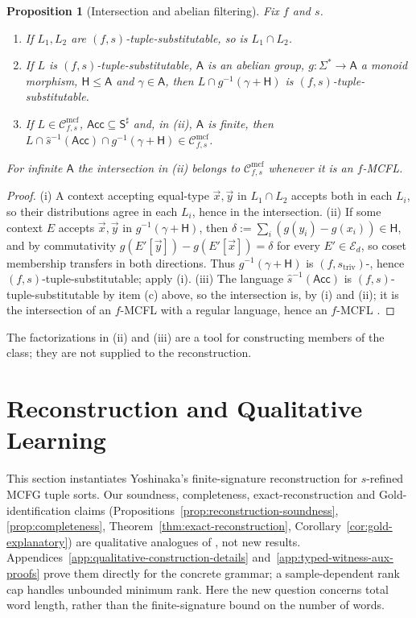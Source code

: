 \documentclass[11pt]{article}
\numberwithin{equation}{section}
\theoremstyle{plain}
\newtheorem{proposition}[theorem]{Proposition}
\theoremstyle{definition}
\theoremstyle{remark}
\newcommand{\Cmcf}[2]{\mathcal{C}^{\mathrm{mcf}}_{#1,#2}}
\newcommand{\tuple}[1]{\vec{#1}}
\theoremstyle{plain}
\begin{document}
\begin{proposition}[Intersection and abelian filtering]
\label{prop:abelian-coset-filter}
Fix $f$ and $s$.
\begin{enumerate}[label=(\roman*),leftmargin=*]
\item If $L_1,L_2$ are $(f,s)$-tuple-substitutable, so is $L_1\cap L_2$.
\item If $L$ is $(f,s)$-tuple-substitutable, $\mathsf A$ is an abelian group,
$g:\Sigma^*\to\mathsf A$ a monoid morphism, $\mathsf H\le\mathsf A$ and
$\gamma\in\mathsf A$, then $L\cap g^{-1}(\gamma+\mathsf H)$ is
$(f,s)$-tuple-substitutable.
\item If $L\in\Cmcf{f}{s}$, $\mathsf{Acc}\subseteq\mathsf S^\sharp$ and, in (ii),
$\mathsf A$ is finite, then
$L\cap\widehat{s}^{-1}(\mathsf{Acc})\cap g^{-1}(\gamma+\mathsf H)\in\Cmcf{f}{s}$.
\end{enumerate}
For infinite $\mathsf A$ the intersection in (ii) belongs to $\Cmcf{f}{s}$ whenever
it is an $f$-MCFL.
\end{proposition}

\begin{proof}
(i) A context accepting equal-type $\tuple x,\tuple y$ in $L_1\cap L_2$ accepts
both in each $L_i$, so their distributions agree in each $L_i$, hence in the
intersection.  (ii) If some context $E$ accepts $\tuple x,\tuple y$ in
$g^{-1}(\gamma+\mathsf H)$, then
$\delta:=\sum_i(g(y_i)-g(x_i))\in\mathsf H$, and by commutativity
$g(E'[\tuple y])-g(E'[\tuple x])=\delta$ for every
$E'\in\mathcal E_d$, so coset membership transfers in both directions.  Thus
$g^{-1}(\gamma+\mathsf H)$ is $(f,s_{\mathrm{triv}})$-, hence
$(f,s)$-tuple-substitutable; apply (i).  (iii) The language
$\widehat{s}^{-1}(\mathsf{Acc})$ is $(f,s)$-tuple-substitutable by item (c) above,
so the intersection is, by (i) and (ii); it is the intersection of an $f$-MCFL with
a regular language, hence an $f$-MCFL \cite{SekiEtAl1991}.
\end{proof}

The factorizations in (ii) and (iii) are a tool for constructing members of the
class; they are not supplied to the reconstruction.

\section{Reconstruction and Qualitative Learning}
\label{sec:learner}

This section instantiates Yoshinaka's finite-signature reconstruction
\cite{Yoshinaka2015General} for $s$-refined MCFG tuple sorts.
Our soundness, completeness, exact-reconstruction and Gold-identification
claims (Propositions~\ref{prop:reconstruction-soundness},
\ref{prop:completeness}, Theorem~\ref{thm:exact-reconstruction},
Corollary~\ref{cor:gold-explanatory}) are qualitative analogues of
\cite[Lemmas~2--3 and Theorem~1]{Yoshinaka2015General},
not new results.  Appendices~\ref{app:qualitative-construction-details}
and~\ref{app:typed-witness-aux-proofs} prove them directly for the
concrete grammar; a sample-dependent rank cap handles unbounded
minimum rank.  Here the new question concerns total word length,
rather than the finite-signature bound on the number of words.
\end{document}
